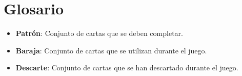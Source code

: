 \documentclass[60pt]{article}
\begin{document}
\section{Glosario}\label{cap:glosario}
\begin{itemize}
    \item \textbf{Patrón}: Conjunto de cartas que se deben completar.
    \item \textbf{Baraja}: Conjunto de cartas que se utilizan durante el juego.
    \item \textbf{Descarte}: Conjunto de cartas que se han descartado durante el juego.
\end{itemize}

\printglossary
\clearpage

\medskip
\printbibliography
\end{document}
